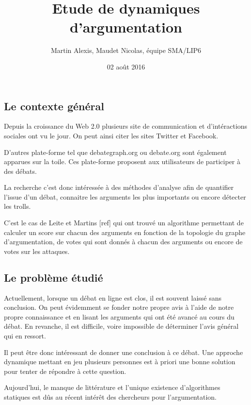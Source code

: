 \documentclass[11pt]{article}
\title{Etude de dynamiques d'argumentation}
\author{Martin Alexis, Maudet Nicolas, équipe SMA/LIP6}
\date{02 août 2016}
\theoremstyle{defi}
\theoremstyle{not}
\theoremstyle{prob}
\begin{document}
\renewcommand{\proofname}{Démonstration}
\maketitle
%



\subsection*{Le contexte général}
  Depuis la croissance du Web 2.0 plusieurs site de communication et d'intéractions sociales ont vu le jour. On peut ainsi citer les sites Twitter et Facebook.

  D'autres plate-forme tel que debategraph.org ou debate.org sont également apparues sur la toile. Ces plate-forme proposent aux utilisateurs de participer à des débats.

  La recherche c'est donc intéressée à des méthodes d'analyse afin de quantifier l'issue d'un débat, connaitre les arguments les plus importants ou encore détecter les trolls.

  C'est le cas de Leite et Martins [ref] qui ont trouvé un algorithme permettant de calculer un score sur chacun des arguments en fonction de la topologie du graphe d'argumentation, de votes qui sont donnés à chacun des arguments ou encore de votes sur les attaques.


\subsection*{Le problème étudié}
  Actuellement, lorsque un débat en ligne est clos, il est souvent laissé sans conclusion.
  On peut évidemment se fonder notre propre avis à l'aide de notre propre connaissance et en lisant les arguments qui ont été avancé au cours du débat.
  En revanche, il est difficile, voire impossible de déterminer l'avis général qui en ressort.

  Il peut être donc intéressant de donner une conclusion à ce débat.
  Une approche dynamique mettant en jeu plusieurs personnes est à priori une bonne solution pour tenter de répondre à cette question.

  Aujourd'hui, le manque de littérature et l'unique existence d'algorithmes statiques est dûs au récent intérêt des chercheurs pour l'argumentation.
\end{document}
